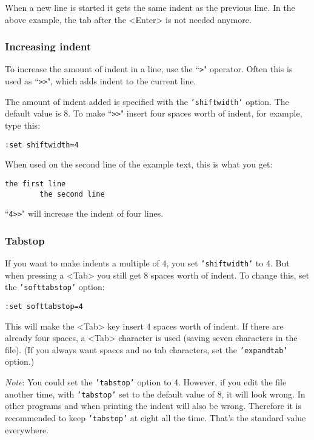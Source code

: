 When a new line is started it gets the same indent as the previous line.
In the above example, the tab after the <Enter> is not needed anymore.

\subsubsection{Increasing indent}
To increase the amount of indent in a line, use the ``\texttt{>}" operator.
Often this is used as ``\texttt{>>}", which adds indent to the current line.

The amount of indent added is specified with the \texttt{'shiftwidth'} option.
The default value is 8.
To make ``\texttt{>>}" insert four spaces worth of indent, for example, type this:

\begin{Verbatim}[samepage=true]
 :set shiftwidth=4
\end{Verbatim}

When used on the second line of the example text, this is what you get:

\begin{Verbatim}[samepage=true]
    the first line 
        the second line 
\end{Verbatim}

``\texttt{4>>}" will increase the indent of four lines.
\subsubsection{Tabstop}
If you want to make indents a multiple of 4, you set \texttt{'shiftwidth'} to 4.
But when pressing a <Tab> you still get 8 spaces worth of indent.
To change this, set the \texttt{'softtabstop'} option:

\begin{Verbatim}[samepage=true]
 :set softtabstop=4
\end{Verbatim}

This will make the <Tab> key insert 4 spaces worth of indent.
If there are already four spaces, a <Tab> character is used (saving seven characters in the file).
(If you always want spaces and no tab characters, set the \texttt{'expandtab'} option.)

\emph{Note}: You could set the \texttt{'tabstop'} option to 4.
However, if you edit the file another time, with \texttt{'tabstop'} set to the default value of 8, it will look wrong.
In other programs and when printing the indent will also be wrong.
Therefore it is recommended to keep \texttt{'tabstop'} at eight all the time.
That's the standard value everywhere.


